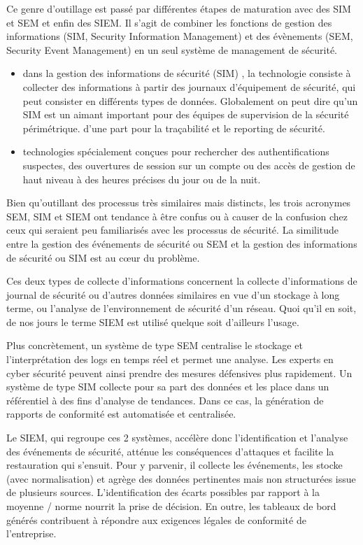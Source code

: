 Ce genre d'outillage est passé par différentes étapes de maturation avec des SIM et SEM  et enfin des SIEM.
Il s’agit de combiner les fonctions de gestion des informations (SIM, Security Information Management) et des évènements  (SEM, Security Event Management) en un seul système de management de sécurité.

\begin{itemize}

	\item dans la gestion des informations de sécurité (SIM) , la technologie consiste  à collecter des informations à partir des journaux d'équipement de sécurité, qui peut consister en différents types de données. Globalement on peut dire qu'un SIM est un aimant important pour des équipes de supervision de la sécurité périmétrique. d'une part pour la traçabilité et le reporting de sécurité.
	\item technologies spécialement conçues pour rechercher des authentifications suspectes, des ouvertures de session sur un compte ou des accès de gestion de haut niveau à des heures précises du jour ou de la nuit.
\end{itemize}

Bien qu'outillant des processus très similaires mais distincts, les trois acronymes SEM, SIM et SIEM ont tendance à être confus ou à causer de la confusion chez ceux qui seraient peu familiarisés avec les processus de sécurité.
La similitude entre la gestion des événements de sécurité ou SEM et la gestion des informations de sécurité ou SIM est au cœur du problème.

Ces deux types de collecte d'informations concernent la collecte d'informations de journal de sécurité ou d'autres données similaires en vue d'un stockage à long terme, ou l'analyse de l'environnement de sécurité d'un réseau. Quoi qu'il en soit, de nos jours le terme SIEM est utilisé quelque soit d'ailleurs l'usage.


Plus concrètement, un système de type SEM centralise le stockage et l’interprétation des logs en temps réel et permet une analyse. Les experts en cyber sécurité peuvent ainsi prendre des mesures défensives plus rapidement. Un système de type SIM collecte pour sa part des données et les place dans un référentiel à des fins d’analyse de tendances. Dans ce cas, la génération de rapports de conformité est automatisée et centralisée.

Le SIEM, qui regroupe ces 2 systèmes, accélère donc l’identification et l’analyse des événements de sécurité, atténue les conséquences d’attaques et facilite la restauration qui s’ensuit. Pour y parvenir, il collecte les événements, les stocke (avec normalisation) et agrège des données pertinentes mais non structurées issue de plusieurs sources. L’identification des écarts possibles par rapport à la moyenne / norme nourrit la prise de décision. En outre, les tableaux de bord générés contribuent à répondre aux exigences légales de conformité de l’entreprise.

